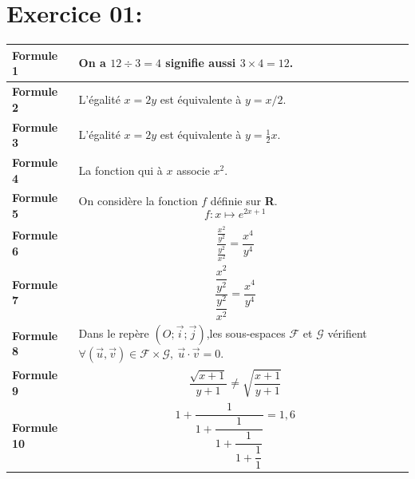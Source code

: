 \documentclass[16pt]{article}
\begin{document}
\section*{Exercice 01:}

\renewcommand{\arraystretch}{2}

\begin{tabular}{lp{15cm}r}
\hline
\textbf{Formule 1} & On a $12 \div 3 = 4$ signifie aussi $3 \times 4 = 12$.\\ \hline
\textbf{Formule 2} & L'égalité $x = 2y$ est équivalente à $y = x/2$.\\\hline
\textbf{Formule 3} & L'égalité $x = 2y$ est équivalente à $y = \frac{1}{2}x$.\\ \hline
\textbf{Formule 4} & La fonction qui à $x$ associe $x^2$.\\ \hline
\textbf{Formule 5} & On considère la fonction $f$ définie sur \textbf{R}. $$f : x\mapsto e^{2x+1}$$\\ \hline
\textbf{Formule 6} & $$\frac{\frac{x^2}{y^2}}{\frac{y^2}{x^2}} = \frac{x^4}{y^4}$$\\ \hline
\textbf{Formule 7} & $$\dfrac{\dfrac{x^2}{y^2}}{\dfrac{y^2}{x^2}} = \frac{x^4}{y^4}$$\\ \hline
\textbf{Formule 8} &
Dans le repère $(O;\vec{i};\vec{j})$,les sous-espaces $\mathcal{F}$ et $\mathcal{G}$
vérifient $\forall (\vec{u},\vec{v}) \in \mathcal{F} \times \mathcal{G}, \ \vec{u}\cdot\vec{v} = 0.$\\ \hline
\textbf{Formule 9} & $$\frac{\sqrt{x+1}}{y+1} \neq \sqrt{\frac{x+1}{y+1}}$$\\ \hline
\textbf{Formule 10}& $$1 + \frac{1}{1 + \dfrac{1}{1 + \dfrac{1}{1 + \dfrac{1}{1}}}} = 1,6$$\\ \hline
\end{tabular}
\end{document}
